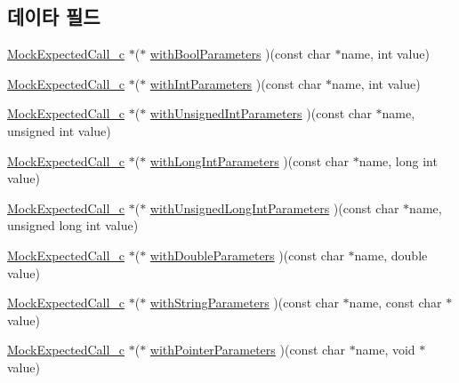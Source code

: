 \subsection*{데이타 필드}
\begin{DoxyCompactItemize}
\item 
\hyperlink{_mock_support__c_8h_a4a6f7402ef6c827e9fe1f32378c1536a}{Mock\+Expected\+Call\+\_\+c} $\ast$($\ast$ \hyperlink{struct_s_mock_expected_call__c_a881cabeaa3bfe6046bf63daccd180600}{with\+Bool\+Parameters} )(const char $\ast$name, int value)
\item 
\hyperlink{_mock_support__c_8h_a4a6f7402ef6c827e9fe1f32378c1536a}{Mock\+Expected\+Call\+\_\+c} $\ast$($\ast$ \hyperlink{struct_s_mock_expected_call__c_aa549ae5b7c879a348202d8f120203996}{with\+Int\+Parameters} )(const char $\ast$name, int value)
\item 
\hyperlink{_mock_support__c_8h_a4a6f7402ef6c827e9fe1f32378c1536a}{Mock\+Expected\+Call\+\_\+c} $\ast$($\ast$ \hyperlink{struct_s_mock_expected_call__c_af0ec6d4712890dfb6da5800dc737ab03}{with\+Unsigned\+Int\+Parameters} )(const char $\ast$name, unsigned int value)
\item 
\hyperlink{_mock_support__c_8h_a4a6f7402ef6c827e9fe1f32378c1536a}{Mock\+Expected\+Call\+\_\+c} $\ast$($\ast$ \hyperlink{struct_s_mock_expected_call__c_ab139d1115b81c7ec704bd4d56943a9f3}{with\+Long\+Int\+Parameters} )(const char $\ast$name, long int value)
\item 
\hyperlink{_mock_support__c_8h_a4a6f7402ef6c827e9fe1f32378c1536a}{Mock\+Expected\+Call\+\_\+c} $\ast$($\ast$ \hyperlink{struct_s_mock_expected_call__c_a040c3fc1ac73b02666875140a945ec28}{with\+Unsigned\+Long\+Int\+Parameters} )(const char $\ast$name, unsigned long int value)
\item 
\hyperlink{_mock_support__c_8h_a4a6f7402ef6c827e9fe1f32378c1536a}{Mock\+Expected\+Call\+\_\+c} $\ast$($\ast$ \hyperlink{struct_s_mock_expected_call__c_af8a5e60e80a87c9c17e69434183d594c}{with\+Double\+Parameters} )(const char $\ast$name, double value)
\item 
\hyperlink{_mock_support__c_8h_a4a6f7402ef6c827e9fe1f32378c1536a}{Mock\+Expected\+Call\+\_\+c} $\ast$($\ast$ \hyperlink{struct_s_mock_expected_call__c_a06c4d87daf983fa91fe8a19ac2a53aaa}{with\+String\+Parameters} )(const char $\ast$name, const char $\ast$value)
\item 
\hyperlink{_mock_support__c_8h_a4a6f7402ef6c827e9fe1f32378c1536a}{Mock\+Expected\+Call\+\_\+c} $\ast$($\ast$ \hyperlink{struct_s_mock_expected_call__c_af8e593d8f6a593685e6769804a9e762f}{with\+Pointer\+Parameters} )(const char $\ast$name, void $\ast$value)

\end{DoxyCompactItemize}
